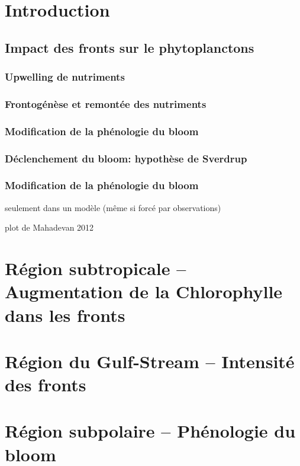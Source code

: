 \documentclass[11pt, french]{beamer}
\begin{document}
\section{Introduction}

\subsection{Impact des fronts sur le phytoplanctons}
\subsubsection{Upwelling de nutriments}

\begin{frame}
  \frametitle{Frontogénèse et remontée des nutriments}
  \centering
\end{frame}

\subsubsection{Modification de la phénologie du bloom}

\begin{frame}
  \frametitle{Déclenchement du bloom: hypothèse de Sverdrup}

\end{frame}

\begin{frame}
  \frametitle{Modification de la phénologie du bloom}
  seulement dans un modèle (même si forcé par observations)

  plot de Mahadevan 2012
\end{frame}

\section{Région subtropicale -- Augmentation de la Chlorophylle dans les fronts}

\section{Région du Gulf-Stream -- Intensité des fronts}

\section{Région subpolaire -- Phénologie du bloom}
\end{document}
